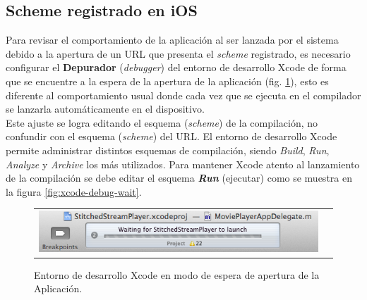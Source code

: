   \subsection{Scheme registrado en iOS}
  
  Para revisar el comportamiento de la aplicación al ser lanzada por el sistema debido a la apertura de un URL que presenta el \textit{scheme} registrado, es necesario configurar el \textbf{Depurador} (\textit{debugger}) del entorno de desarrollo Xcode de forma que se encuentre a la espera de la apertura de la aplicación (fig. \ref{fig:xcode-waitforapp}), esto es diferente al comportamiento usual donde cada vez que se ejecuta en el compilador se lanzarla automáticamente en el dispositivo.\\
  
Este ajuste se logra editando el esquema (\textit{scheme}) de la compilación, no confundir con el esquema (\textit{scheme}) del URL. El entorno de desarrollo Xcode permite administrar distintos esquemas de compilación, siendo \textit{Build}, \textit{Run}, \textit{Analyze} y \textit{Archive} los más utilizados. Para mantener Xcode atento al lanzamiento de la compilación se debe editar el esquema \textbf{\textit{Run}} (ejecutar) como se muestra en la figura \ref{fig:xcode-debug-wait}.
  

\begin{figure}[H]
	\centering
	\begin{tabular}{cc}
	\includegraphics[scale=0.7]{imgs/xcode-waitforapp.png}
	\end{tabular}
	\caption{Entorno de desarrollo Xcode en modo de espera de apertura de la Aplicación.}
	\label{fig:xcode-waitforapp}
\end{figure}
    
